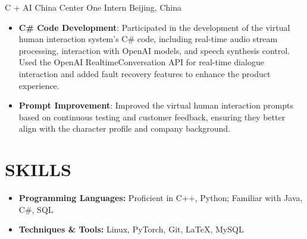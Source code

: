 \documentclass{resume}
\begin{document}
C + AI China Center One Intern \hfill Beijing, China
\begin{itemize}
  \item  \textbf{C\# Code Development}: Participated in the development of the virtual human interaction system's C\# code, including real-time audio stream processing, interaction with OpenAI models, and speech synthesis control. Used the OpenAI RealtimeConversation API for real-time dialogue interaction and added fault recovery features to enhance the product experience.
  \item \textbf{Prompt Improvement}: Improved the virtual human interaction prompts based on continuous testing and customer feedback, ensuring they better align with the character profile and company background.
\end{itemize}



\section{\bf SKILLS}
\begin{itemize}
  \item \textbf{Programming Languages:} Proficient in C++, Python; Familiar with Java, C\#, SQL
  \item \textbf{Techniques \& Tools:} Linux, PyTorch, Git, LaTeX, MySQL
\end{itemize}
\end{document}
